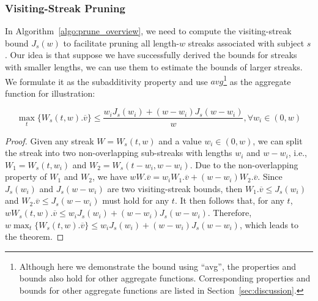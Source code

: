 \subsubsection{Visiting-Streak Pruning}  
\label{sec:visiting-window-bound}
In Algorithm~\ref{algo:prune_overview}, we need to compute the visiting-streak bound $J_s(w)$ to facilitate pruning all length-$w$ streaks associated with subject $s$. Our idea is that suppose we have successfully derived the bounds for streaks with smaller lengths, we can use them to estimate the bounds of larger streaks. We formulate it as the subadditivity property and use $avg$\footnote{Although here we demonstrate the bound
using ``avg'', the properties and bounds also hold for other aggregate functions. Corresponding properties and bounds for other aggregate functions are listed in Section~\ref{sec:discussion}.
} as the aggregate function for illustration: 

\begin{theorem}
\label{lem:subaverage}
\begin{equation}
\label{eq:subadditivity}
	\max_t\{W_s(t,w).\overline{v}\} \leq \frac{w_i J_s(w_i) + (w-w_i) J_s(w-w_i)}{w}, \forall w_i \in (0,w)
\end{equation}
\end{theorem}
\begin{proof}
Given any streak $W=W_s(t,w)$ and a value $w_i \in (0,w)$, we can split the streak into two non-overlapping sub-streaks with lengths $w_i$ and $w-w_i$, i.e., $W_1 = W_s(t,w_i)$ and $W_2 = W_s(t-w_i, w-w_i)$. Due to the non-overlapping property of $W_1$ and $W_2$, we have $wW.\overline{v} = w_iW_1.\overline{v} + (w-w_i)W_2.\overline{v}$.  Since $J_s(w_i)$ and $J_s(w-w_i)$ are two visiting-streak bounds, then $W_1.\overline{v}\leq J_s(w_i)$ and $W_2.\overline{v}\leq J_s(w-w_i)$ must hold for any $t$. 
It then follows that, for any $t$, $wW_s(t,w).\overline{v} \leq w_i J_s(w_i) + (w-w_i) J_s(w-w_i)$. Therefore, $w\max_t\{W_s(t,w).\overline{v}\} \leq w_i J_s(w_i) + (w-w_i) J_s(w-w_i)$,  which leads to the theorem. %
\end{proof}





